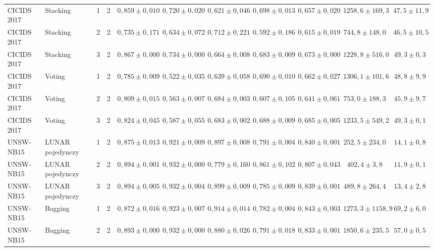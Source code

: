 \begin{table}[H]
{\begin{tabular}{llllccccccc}
CICIDS 2017 & Stacking & 1 & 2 & $0{,}859 \pm 0{,}010$ & $0{,}720 \pm 0{,}020$ & $0{,}621 \pm 0{,}046$ & $0{,}698 \pm 0{,}013$ & $0{,}657 \pm 0{,}020$ & $1258{,}6 \pm 169{,}3$ & $47{,}5 \pm 11{,}9$ \\
CICIDS 2017 & Stacking & 2 & 2 & $0{,}735 \pm 0{,}171$ & $0{,}634 \pm 0{,}072$ & $0{,}712 \pm 0{,}221$ & $0{,}592 \pm 0{,}186$ & $0{,}615 \pm 0{,}019$ & $744{,}8 \pm 148{,}0$ & $46{,}5 \pm 10{,}5$ \\
CICIDS 2017 & Stacking & 3 & 2 & $0{,}867 \pm 0{,}000$ & $0{,}734 \pm 0{,}000$ & $0{,}664 \pm 0{,}008$ & $0{,}683 \pm 0{,}009$ & $0{,}673 \pm 0{,}000$ & $1228{,}8 \pm 516{,}0$ & $49{,}3 \pm 0{,}3$ \\
CICIDS 2017 & Voting & 1 & 2 & $0{,}785 \pm 0{,}009$ & $0{,}522 \pm 0{,}035$ & $0{,}639 \pm 0{,}058$ & $0{,}690 \pm 0{,}010$ & $0{,}662 \pm 0{,}027$ & $1306{,}1 \pm 101{,}6$ & $48{,}8 \pm 9{,}9$ \\
CICIDS 2017 & Voting & 2 & 2 & $0{,}809 \pm 0{,}015$ & $0{,}563 \pm 0{,}007$ & $0{,}684 \pm 0{,}003$ & $0{,}607 \pm 0{,}105$ & $0{,}641 \pm 0{,}061$ & $753{,}0 \pm 188{,}3$ & $45{,}9 \pm 9{,}7$ \\
CICIDS 2017 & Voting & 3 & 2 & $0{,}824 \pm 0{,}045$ & $0{,}587 \pm 0{,}055$ & $0{,}683 \pm 0{,}002$ & $0{,}688 \pm 0{,}009$ & $0{,}685 \pm 0{,}005$ & $1233{,}5 \pm 549{,}2$ & $49{,}3 \pm 0{,}1$ \\
\hline
UNSW-NB15 & LUNAR pojedynczy & 1 & 2 & $0{,}875 \pm 0{,}013$ & $0{,}921 \pm 0{,}009$ & $0{,}897 \pm 0{,}008$ & $0{,}791 \pm 0{,}004$ & $0{,}840 \pm 0{,}001$ & $252{,}5 \pm 234{,}0$ & $14{,}1 \pm 0{,}8$ \\
UNSW-NB15 & LUNAR pojedynczy & 2 & 2 & $0{,}894 \pm 0{,}001$ & $0{,}932 \pm 0{,}000$ & $0{,}779 \pm 0{,}160$ & $0{,}861 \pm 0{,}102$ & $0{,}807 \pm 0{,}043$ & $402{,}4 \pm 3{,}8$ & $11{,}9 \pm 0{,}1$ \\
UNSW-NB15 & LUNAR pojedynczy & 3 & 2 & $0{,}894 \pm 0{,}005$ & $0{,}932 \pm 0{,}004$ & $0{,}899 \pm 0{,}009$ & $0{,}785 \pm 0{,}009$ & $0{,}839 \pm 0{,}001$ & $489{,}8 \pm 264{,}4$ & $13{,}4 \pm 2{,}8$ \\
UNSW-NB15 & Bagging & 1 & 2 & $0{,}872 \pm 0{,}016$ & $0{,}923 \pm 0{,}007$ & $0{,}914 \pm 0{,}014$ & $0{,}782 \pm 0{,}004$ & $0{,}843 \pm 0{,}003$ & $1273{,}3 \pm 1158{,}9$ & $69{,}2 \pm 6{,}0$ \\
UNSW-NB15 & Bagging & 2 & 2 & $0{,}893 \pm 0{,}000$ & $0{,}932 \pm 0{,}000$ & $0{,}880 \pm 0{,}026$ & $0{,}791 \pm 0{,}018$ & $0{,}833 \pm 0{,}001$ & $1850{,}6 \pm 235{,}5$ & $57{,}0 \pm 0{,}5$ \\

\end{tabular}}
\end{table}
